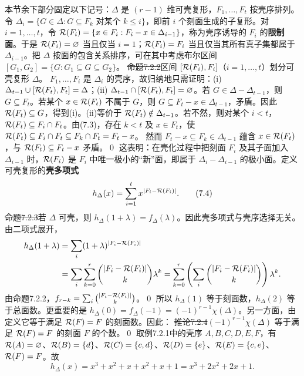 本节余下部分固定以下记号：$\Delta$ 是 $(r-1)$ 维可壳复形，$F_1,\ldots,F_t$ 按壳序排列。令 $\Delta_i=\{G\in\Delta:G\subseteq F_k\text{ 对某个 }k\le i\}$，即前 $i$ 个刻面生成的子复形。对 $i=1,\ldots,t$，令 $\mathcal R(F_i)=\{x\in F_i:F_i-x\in\Delta_{i-1}\}$，称为壳序诱导的 $F_i$ 的\textbf{限制面}。于是 $\mathcal R(F_i)=\varnothing$ 当且仅当 $i=1$；$\mathcal R(F_i)=F_i$ 当且仅当其所有真子集都属于 $\Delta_{i-1}$。把 $\Delta$ 按面的包含关系排序，可在其中考虑布尔区间 $[G_1,G_2]=\{G:G_1\subseteq G\subseteq G_2\}$。
\st{命题7.2.2}区间 $[\mathcal R(F_i),F_i]$（$i=1,\ldots,t$）划分可壳复形 $\Delta$。
\pr $F_1,\ldots,F_i$ 是 $\Delta_i$ 的壳序，故归纳地只需证明：(i) $\Delta_{t-1}\cup[\mathcal R(F_t),F_t]=\Delta$；(ii) $\Delta_{t-1}\cap[\mathcal R(F_t),F_t]=\varnothing$。若 $G\in\Delta-\Delta_{t-1}$，则 $G\subseteq F_t$。若某个 $x\in\mathcal R(F_t)$ 不属于 $G$，则 $G\subseteq F_t-x\in\Delta_{t-1}$，矛盾。因此 $\mathcal R(F_t)\subseteq G$，得到(i)。(ii)等价于 $\mathcal R(F_t)\notin\Delta_{t-1}$。若不然，则对某个 $i<t$，$\mathcal R(F_t)\subseteq F_i\cap F_t$。由(7.3)，存在 $k<t$ 及 $x\in F_t$，使 $\mathcal R(F_t)\subseteq F_i\cap F_t\subseteq F_k\cap F_t=F_t-x$。
然而 $F_t-x\subseteq F_k\in\Delta_{t-1}$ 蕴含 $x\in\mathcal R(F_t)$，与 $\mathcal R(F_t)\subseteq F_t-x$ 矛盾。\qed
这表明：在壳化过程中把刻面 $F_i$ 及其子面加入 $\Delta_{i-1}$ 时，$\mathcal R(F_i)$ 是 $F_i$ 中唯一极小的“新”面，即属于 $\Delta_i-\Delta_{i-1}$ 的极小面。定义可壳复形的\textbf{壳多项式}
\[h_\Delta(x)=\sum_{i=1}^t x^{|F_i-\mathcal R(F_i)|}.\tag{7.4}\]
\st{命题7.2.3}若 $\Delta$ 可壳，则 $h_\Delta(1+\lambda)=f_\Delta(\lambda)$。因此壳多项式与壳序选择无关。
\pr 由二项式展开，
\[\begin{aligned}
h_\Delta(1+\lambda)&=\sum_i(1+\lambda)^{|F_i-\mathcal R(F_i)|}\\
&=\sum_i\sum_{k=0}^r\binom{|F_i-\mathcal R(F_i)|}{k}\lambda^k
=\sum_{k=0}^r\left(\sum_i\binom{|F_i-\mathcal R(F_i)|}{k}\right)\lambda^k.
\end{aligned}\]
由命题7.2.2，$f_{r-k}=\sum_i\binom{|F_i-\mathcal R(F_i)|}{k}$。\qed
所以 $h_\Delta(1)$ 等于刻面数，$h_\Delta(2)$ 等于总面数。更重要的是 $h_\Delta(0)=f_\Delta(-1)=(-1)^{r-1}\chi(\Delta)$。另一方面，由定义它等于满足 $\mathcal R(F)=F$ 的刻面数。因此：
\st{推论7.2.4}$(-1)^{r-1}\chi(\Delta)$ 等于满足 $\mathcal R(F)=F$ 的刻面 $F$ 的个数。\qed
取例7.2.1中的壳序 $A,B,C,D,E,F$，有 $\mathcal R(A)=\varnothing$、$\mathcal R(B)=\{d\}$、$\mathcal R(C)=\{c,d\}$、$\mathcal R(D)=\{e\}$、$\mathcal R(E)=\{c,e\}$、$\mathcal R(F)=F$。故
\[h_\Delta(x)=x^3+x^2+x+x^2+x+1=x^3+2x^2+2x+1.\]
